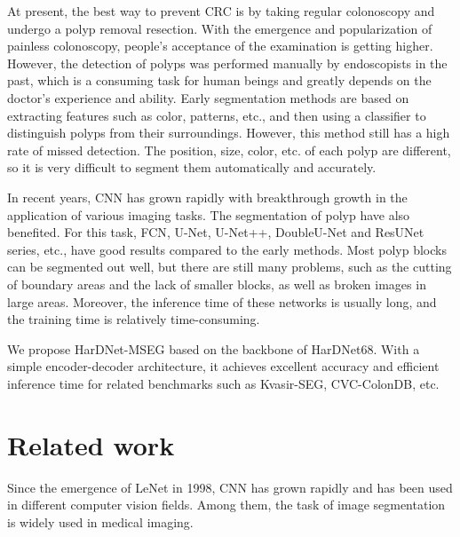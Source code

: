 \documentclass{article}
\begin{document}
\vspace{4mm}
    At present, the best way to prevent CRC is by taking regular colonoscopy and undergo a polyp removal resection. 
    With the emergence and popularization of painless colonoscopy, people's acceptance of the examination is getting higher.
    However, the detection of polyps was performed manually by endoscopists in the past, which is a consuming task for human beings and greatly depends on the doctor’s experience and ability. 
    Early segmentation methods\cite{auto1,auto2,auto3} are based on extracting features such as color, patterns, etc., and then using a classifier to distinguish polyps from their surroundings. 
    However, this method still has a high rate of missed detection. The position, size, color, etc. of each polyp are different, so it is very difficult to segment them automatically and accurately.

\vspace{4mm}
    In recent years, CNN has grown rapidly with breakthrough growth in the application of various imaging tasks. The segmentation of polyp have also benefited\cite{fully1,fully2}. 
    For this task, FCN\cite{FCN,fully1,fully2}, U-Net\cite{y-net,u-net}, U-Net++\cite{unet1,unet2}, DoubleU-Net\cite{jha2020doubleu} and ResUNet\cite{jha2019resunet++, yang2019road, jha2020real} series, etc., have good results compared to the early methods. 
    Most polyp blocks can be segmented out well, but there are still many problems, such as the cutting of boundary areas and the lack of smaller blocks, as well as broken images in large areas. 
    Moreover, the inference time of these networks is usually long, and the training time is relatively time-consuming.

\vspace{4mm}
    We propose HarDNet-MSEG based on the backbone of HarDNet68\cite{chao2019hardnet}. 
    With a simple encoder-decoder\cite{badrinarayanan2017segnet} architecture, it achieves excellent accuracy and efficient inference time for related benchmarks such as Kvasir-SEG, CVC-ColonDB, etc.


\section{Related work}
    \hspace*{0.5cm}Since the emergence of LeNet\cite{lecun2015lenet} in 1998, CNN has grown rapidly and has been used in different computer vision fields. Among them, the task of image segmentation is widely used in medical imaging.
    
\end{document}
